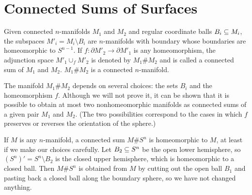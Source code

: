 \section{Connected Sums of Surfaces}
Given connected $n$-manifolds $M_1$ and $M_2$ and regular coordinate balls $B_i\subseteq M_i$, the subspaces $M'_i=M_i\setminus B_i$ are $n$-manifolds with boundary whose boundaries are homeomorphic to $S^{n-1}$. If $f:\partial M'_2\to\partial M'_1$ is any homeomorphism, the adjunction space $M'_1\cup_fM'_2$ is denoted by $M_1\#M_2$ and is called a connected sum of $M_1$ and $M_2$. $M_1\#M_2$ is a connected $n$-manifold.\par
The manifold $M_1\#M_2$ depends on several choices: the sets $B_i$ and the homeomorphism $f$. Although we will not prove it, it can be shown that it is possible to obtain at most two nonhomeomorphic manifolds as connected sums of a given pair $M_1$ and $M_2$. (The two possibilities correspond to the cases in which $f$ preserves or reverses the orientation of the sphere.)
\begin{example}
If $M$ is any $n$-manifold, a connected sum $M\#S^n$ is homeomorphic to $M$, at least if we make our choices carefully. Let $B_2\subseteq S^n$ be the open lower hemisphere, so $(S^n)'=S^n\setminus B_2$ is the closed upper hemisphere, which is
homeomorphic to a closed ball. Then $M\#S^n$ is obtained from $M$ by cutting out the open ball $B_1$ and pasting back a closed ball along the boundary sphere, so we have not changed anything.
\end{example}
